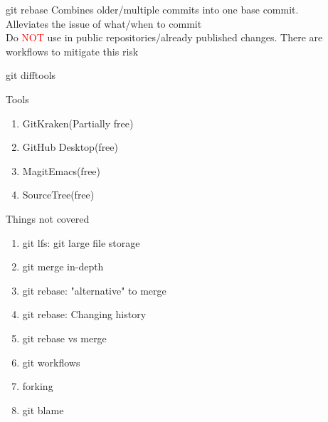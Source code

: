 \documentclass{beamer}
\begin{document}
\begin{frame}[fragile,t]{git rebase}\vspace{10pt}
  Combines older/multiple commits into one base commit.\vspace{10pt}\\
  Alleviates the issue of what/when to commit\vspace{10pt}\\
  Do \textcolor{red}{NOT} use in public repositories/already published changes. There are workflows to mitigate this risk
\end{frame}

\begin{frame}[fragile,t]{git difftools}\vspace{10pt}
\end{frame}

\begin{frame}[fragile,t]{Tools}\vspace{10pt}
  \begin{enumerate}
    \item GitKraken(Partially free)
      \item GitHub Desktop(free)
    \item Magit{Emacs}(free)
    \item SourceTree(free)
  \end{enumerate}
\end{frame}


\begin{frame}[fragile,t]{Things not covered}\vspace{10pt}
  \begin{enumerate}
    \item git lfs: git large file storage
    \item git merge in-depth
    \item git rebase: "alternative" to merge %
    \item git rebase: Changing history %
    \item git rebase vs merge
    \item git workflows
    \item forking 
    \item git blame
  \end{enumerate}
\end{frame}
\end{document}
